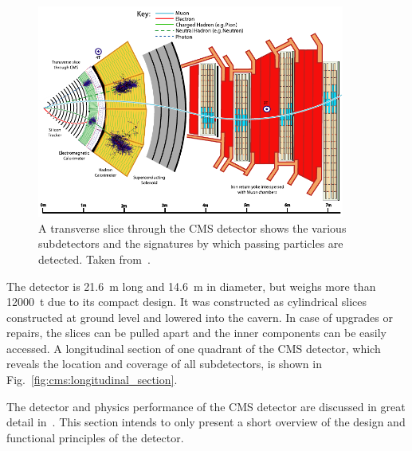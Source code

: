 \begin{figure}[bthp]
    \centering
    \includegraphics[width=0.9\textwidth]{figures/experimental_setup/cms_slice.pdf}
    \caption[Transverse slice of the CMS detector]{A transverse slice through the
        CMS detector shows the various subdetectors and the signatures by which
        passing particles are detected. Taken from~\cite{Barney:2120661}.}
    \label{fig:cms:transverse_slice}
\end{figure}

The detector is \SI{21.6}{\meter} long and \SI{14.6}{\meter} in diameter, but
weighs more than \SI{12000}{\tonne} due to its compact design. It was
constructed as cylindrical slices constructed at ground level and lowered into
the cavern. In case of upgrades or repairs, the slices can be pulled apart and
the inner components can be easily accessed. A longitudinal section of one
quadrant of the CMS detector, which reveals the location and coverage of all
subdetectors, is shown in Fig.~\ref{fig:cms:longitudinal_section}.

The detector and physics performance of the CMS detector are discussed in great
detail in~\cite{Bayatian:922757,Ball:2007zza,Chatrchyan:2008aa}. This section
intends to only present a short overview of the design and functional principles
of the detector.

